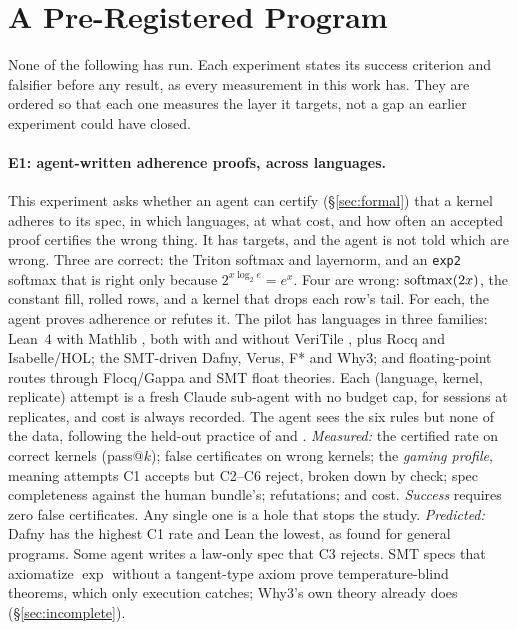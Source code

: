 \section{A Pre-Registered Program}
\label{sec:program}

None of the following has run. Each experiment states its success criterion and
falsifier before any result, as every measurement in this work has. They are ordered
so that each one measures the layer it targets, not a gap an earlier experiment could
have closed.

\paragraph{E1: agent-written adherence proofs, across languages.}
This experiment asks whether an agent can certify (\S\ref{sec:formal}) that a kernel adheres
to its spec, in which languages, at what cost, and how often an accepted proof certifies
the wrong thing. It has \pilotTargets{} targets, and the agent is not told which are wrong.
Three are correct: the Triton softmax and layernorm, and an \texttt{exp2} softmax that is
right only because $2^{x\log_2 e} = e^x$. Four are wrong: $\operatorname{softmax}(2x)$, the constant
fill, rolled rows, and a kernel that drops each row's tail. For each, the agent proves
adherence or refutes it. The pilot has \pilotLanguages{} languages in three families:
Lean~4 with Mathlib \citep{demoura2021lean4,mathlib2020}, both with and without VeriTile
\citep{veritile2026}, plus Rocq and Isabelle/HOL; the SMT-driven Dafny, Verus, F* and Why3;
and floating-point routes through Flocq/Gappa and SMT float theories. Each
(language, kernel, replicate) attempt is a fresh Claude sub-agent with no budget cap, for
\pilotSessions{} sessions at \pilotReplicates{} replicates, and cost is always recorded.
The agent sees the six rules but none of the data, following the held-out practice of
\citet{ye2025verina} and \citet{thakur2025clever}.
\emph{Measured:} the certified rate on correct kernels (pass@$k$); false certificates on
wrong kernels; the \emph{gaming profile}, meaning attempts C1 accepts but C2--C6 reject,
broken down by check; spec completeness against the human bundle's; refutations; and
cost. \emph{Success} requires zero false certificates. Any single one is a hole that stops
the study. \emph{Predicted:} Dafny has the highest C1 rate and Lean the lowest, as
\citet{bursuc2025vericoding} found for general programs. Some agent writes a law-only spec
that C3 rejects. SMT specs that axiomatize $\exp$ without a tangent-type axiom prove
temperature-blind theorems, which only execution catches; Why3's own theory already
does (\S\ref{sec:incomplete}).

